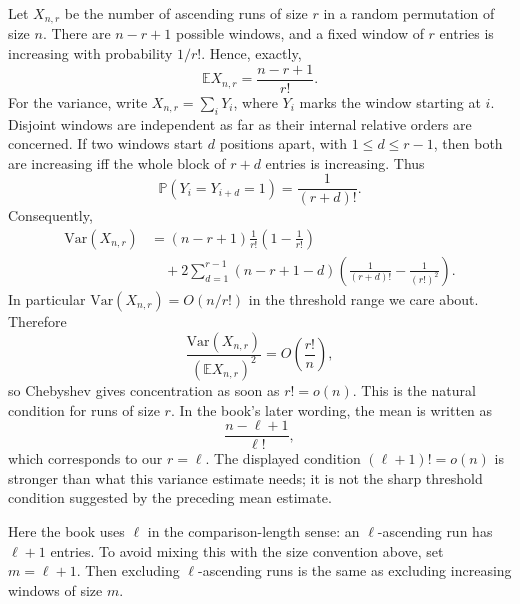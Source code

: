 Let $X_{n,r}$ be the number of ascending runs of size $r$ in a random permutation of size $n$.
There are $n-r+1$ possible windows, and a fixed window of $r$ entries is increasing with
probability $1/r!$. Hence, exactly,
\begin{equation*}
    \mathbb{E}X_{n,r}=\frac{n-r+1}{r!}.
\end{equation*}
For the variance, write $X_{n,r}=\sum_i Y_i$, where $Y_i$ marks the window starting at $i$.
Disjoint windows are independent as far as their internal relative orders are concerned. If two
windows start $d$ positions apart, with $1\leq d\leq r-1$, then both are increasing iff the whole
block of $r+d$ entries is increasing. Thus
\begin{equation*}
    \mathbb{P}(Y_i=Y_{i+d}=1)=\frac{1}{(r+d)!}.
\end{equation*}
Consequently,
\begin{equation*}
    \begin{aligned}
    \mathrm{Var}(X_{n,r})
        &=(n-r+1)\frac{1}{r!}\left(1-\frac{1}{r!}\right) \\
        &\quad
        +2\sum_{d=1}^{r-1}(n-r+1-d)
            \left(\frac{1}{(r+d)!}-\frac{1}{(r!)^2}\right).
    \end{aligned}
\end{equation*}
In particular $\mathrm{Var}(X_{n,r})=O(n/r!)$ in the threshold range we care about. Therefore
\begin{equation*}
    \frac{\mathrm{Var}(X_{n,r})}{(\mathbb{E}X_{n,r})^2}
        =O\left(\frac{r!}{n}\right),
\end{equation*}
so Chebyshev gives concentration as soon as $r!=o(n)$. This is the natural condition for runs
of size $r$. In the book's later wording, the mean is written as
\begin{equation*}
    \frac{n-\ell+1}{\ell!},
\end{equation*}
which corresponds to our $r=\ell$. The displayed condition $(\ell+1)!=o(n)$ is stronger than
what this variance estimate needs; it is not the sharp threshold condition suggested by the
preceding mean estimate.


Here the book uses $\ell$ in the comparison-length sense: an $\ell$-ascending run has
$\ell+1$ entries. To avoid mixing this with the size convention above, set
$m=\ell+1$. Then excluding $\ell$-ascending runs is the same as excluding increasing
windows of size $m$.

